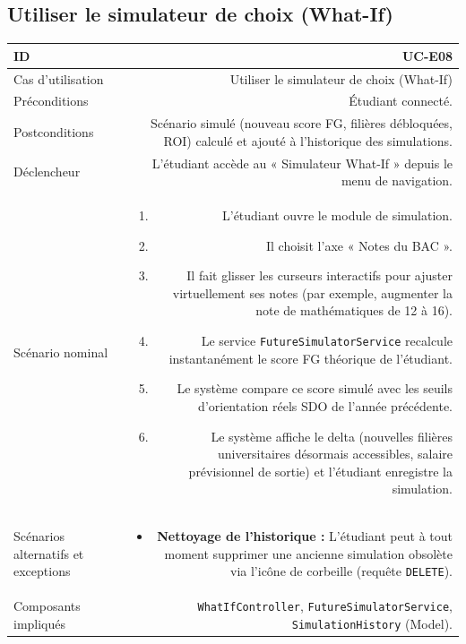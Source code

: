 \vspace{1.5em}

\subsection{Utiliser le simulateur de choix (What-If)}

\noindent
{}
\begin{tabularx}{\linewidth}{|L|R|}
\hline
{}ID & UC-E08 \\
\hline
Cas d'utilisation & Utiliser le simulateur de choix (What-If) \\
\hline
{}Préconditions & Étudiant connecté. \\
\hline
Postconditions & Scénario simulé (nouveau score FG, filières débloquées, ROI) calculé et ajouté à l'historique des simulations. \\
\hline
{}Déclencheur & L'étudiant accède au « Simulateur What-If » depuis le menu de navigation. \\
\hline
Scénario nominal &
\begin{enumerate}[nosep,leftmargin=*]
  \item L'étudiant ouvre le module de simulation.
  \item Il choisit l'axe « Notes du BAC ».
  \item Il fait glisser les curseurs interactifs pour ajuster virtuellement ses notes (par exemple, augmenter la note de mathématiques de 12 à 16).
  \item Le service \texttt{FutureSimulatorService} recalcule instantanément le score FG théorique de l'étudiant.
  \item Le système compare ce score simulé avec les seuils d'orientation réels SDO de l'année précédente.
  \item Le système affiche le delta (nouvelles filières universitaires désormais accessibles, salaire prévisionnel de sortie) et l'étudiant enregistre la simulation.
\end{enumerate} \\
\hline
{}Scénarios alternatifs et exceptions &
\begin{itemize}[nosep,leftmargin=*]
  \item \textbf{Nettoyage de l'historique :} L'étudiant peut à tout moment supprimer une ancienne simulation obsolète via l'icône de corbeille (requête \texttt{DELETE}).
\end{itemize} \\
\hline
Composants impliqués & \texttt{WhatIfController}, \texttt{FutureSimulatorService}, \texttt{SimulationHistory} (Model). \\
\hline
\end{tabularx}

